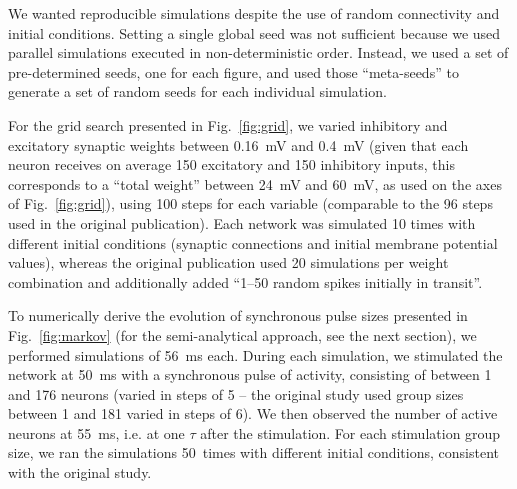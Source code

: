 \documentclass[10pt,a4paper,onecolumn]{article}
\begin{document}
We wanted reproducible simulations despite the use of random connectivity and initial conditions. Setting a single global seed was not sufficient because we used parallel simulations executed in non-deterministic order. Instead, we used a set of pre-determined seeds, one for each figure, and used those ``meta-seeds'' to generate a set of random seeds for each individual simulation.

For the grid search presented in Fig.~\ref{fig:grid}, we varied inhibitory and excitatory synaptic weights between \SI{0.16}{\milli\volt} and \SI{0.4}{\milli\volt} (given that each neuron receives on average 150 excitatory and 150 inhibitory inputs, this corresponds to a ``total weight'' between \SI{24}{\milli\volt} and \SI{60}{\milli\volt}, as used on the axes of Fig.~\ref{fig:grid}), using 100 steps for each variable (comparable to the 96 steps used in the original publication). Each network was simulated 10 times with different initial conditions (synaptic connections and initial membrane potential values), whereas the original publication used 20 simulations per weight combination and additionally added ``1--50 random spikes initially in transit''.

To numerically derive the evolution of synchronous pulse sizes presented in Fig.~\ref{fig:markov} (for the semi-analytical approach, see the next section), we performed simulations of \SI{56}{\milli\second} each. During each simulation, we stimulated the network at \SI{50}{\milli\second} with a synchronous pulse of activity, consisting of between 1 and 176 neurons (varied in steps of 5 -- the original study used group sizes between 1 and 181 varied in steps of 6). We then observed the number of active neurons at \SI{55}{\milli\second}, i.e. at one $\tau$ after the stimulation. For each stimulation group size, we ran the simulations 50~times with different initial conditions, consistent with the original study.
\end{document}
